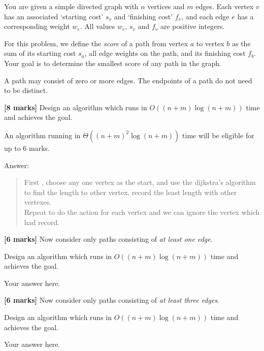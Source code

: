 \documentclass{article}
\begin{document}
\setcounter{question}{2}

\begin{Question}
You are given a simple directed graph with $n$ vertices and $m$ edges. Each vertex $v$ has an associated `starting cost' $s_v$ and `finishing cost' $f_v$, and each edge $e$ has a corresponding weight $w_e$. All values $w_e$, $s_v$ and $f_v$ are positive integers.

For this problem, we define the \emph{score} of a path from vertex $a$ to vertex $b$ as the sum of its starting cost $s_a$, all edge weights on the path, and its finishing cost $f_b$. Your goal is to determine the smallest score of any path in the graph.

A path may consist of zero or more edges. The endpoints of a path do not need to be distinct.

\begin{Subquestion}
\textbf{[8 marks]} Design an algorithm which runs in $O((n+m) \log (n+m))$ time and achieves the goal.

An algorithm running in $\Theta((n+m)^2 \log (n+m))$ time will be eligible for up to 6 marks.

\begin{answer}
Answer:\\
\begin{quote}
    First , choose any one vertex as the start, and use the dijkstra's algorithm to find the length to other vertex. record the least length with other vertexes. \\
    Repeat to do the action for each vertex and we can ignore the vertex which had record.\\
\end{quote}
\end{answer}
\end{Subquestion}

\begin{Subquestion}
\textbf{[6 marks]} Now consider only paths consisting of \emph{at least one edge}.

Design an algorithm which runs in $O((n+m) \log (n+m))$ time and achieves the goal.

\begin{answer}
Your answer here.
\end{answer}
\end{Subquestion}

\begin{Subquestion}
\textbf{[6 marks]} Now consider only paths consisting of \emph{at least three edges}.

Design an algorithm which runs in $O((n+m) \log (n+m))$ time and achieves the goal.

\begin{answer}
Your answer here.
\end{answer}
\end{Subquestion}
\end{Question}
\end{document}
